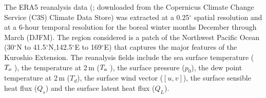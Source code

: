 The ERA5 reanalysis data (\citet{ERA5_data,hersbach2020era5}; downloaded from the Copernicus Climate Change Service (C3S) Climate Data Store) was extracted at a 0.25$^{\circ}$ spatial resolution and at a 6-hour temporal resolution for the boreal winter months December through March (DJFM). The region considered is a patch of the Northwest Pacific Ocean (30$^\circ$N to 41.5$^\circ$N,142.5$^\circ$E to 169$^\circ$E) that captures the major features of the Kuroshio Extension. The reanalysis fields include the sea surface temperature ($T_o\hspace*{1mm}$), the temperature at 2\,m ($T_a\hspace*{1mm}$), the surface pressure ($p_0$), the dew point temperature at 2\,m ($T_d$), the surface wind vector ($[u,v]$), the surface sensible heat flux ($Q_s$) and the surface latent heat flux ($Q_L$). \par 